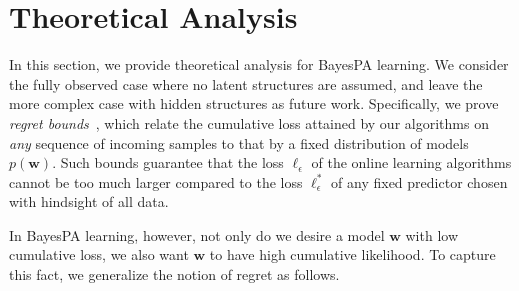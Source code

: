 \documentclass[twoside,11pt]{article}
\newcommand{\xv}{\bm{x}}
\newcommand{\regret}{\mathcal{R}}
\newcommand{\wv}{\bm{w}}
\newcommand{\eat}[1]{}
\begin{document}
{

\section{Theoretical Analysis}\label{sec:theory}

In this section, we provide theoretical analysis for BayesPA learning. We consider the fully observed case where no latent structures are assumed, and leave the more complex case with hidden structures as future work. Specifically, we prove \emph{regret bounds}~\citep{murphy2012machine_reget,shalev2006convex}, which relate the cumulative loss attained by our algorithms on \emph{any} sequence of incoming samples to that by a fixed distribution of models $p(\wv)$. Such bounds guarantee that the loss $\ell_\epsilon$ of the online learning algorithms cannot be too much larger compared to the loss $\ell^*_\epsilon$ of any fixed predictor chosen with hindsight of all data.

\eat{
\begin{definition}
\textbf{(Bayesian Regret)} Let $(\xv_0, y_0)$, $...$, $(\xv_{T-1}, y_{T-1})$ be a sequence of incoming data where $\xv_t \in \mathbb{R}^K$ and $y_t \in \{-1, 1\}$. The Bayesian Regret of online Bayesian learning with both likelihood function $p(\xv | \wv)$ and loss function $\ell_\epsilon(q(\wv); \xv, y)$ is defined as
\begin{equation}
\regret_T(q(\wv)) = \sum\limits_{t=0}^{T-1}{\ell_\epsilon(q_t(\wv | \xv_t); \xv_t, y_t)}
\end{equation}
where $q_t(\wv | \xv_t) \propto q_t(\wv) p(\xv | \wv)$ is the posterior from observing $\xv_t$. We use the notation $\regret_T^\text{ave}$ for $\ell_\epsilon^\text{ave}$ and $\regret_T^\text{gibbs}$ for $\ell_\epsilon^\text{gibbs}$.
\end{definition}

In other words, the regret is incurred cumulatively round by round: At the beginning of each round, the algorithm observes $\xv_t$, updates its belief about $\wv$ via the Bayes' rule, and makes a decision; the decision then incurs loss at the end of each round via $\ell_\epsilon(q(\wv); \xv_t, y_t)$. Note that for non-likelihood BayesPA, the Bayesian regret reduces to the typical notion of regret. }

In BayesPA learning, however, not only do we desire a model $\wv$ with low cumulative loss, we also want $\wv$ to have high cumulative likelihood. To capture this fact, we generalize the notion of regret as follows.

}
\end{document}
